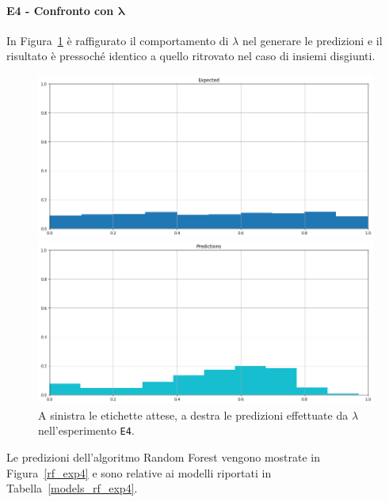 \documentclass[12pt]{report}
\theoremstyle{definition}
\begin{document}
\paragraph{E4 - Confronto con $\bm{\lambda}$}
In Figura~\ref{prediction_exp4} è raffigurato il comportamento di $\lambda$ nel generare le predizioni e il risultato è pressoché identico a quello ritrovato nel caso di insiemi disgiunti.
\begin{figure}
\centering
    \begin{minipage}{0.48\textwidth}
        \includegraphics[width=\linewidth]{images/experiment_uniform_sovrapposti/expected_memberships.png}
    \end{minipage}
    \begin{minipage}{0.48\textwidth}
        \includegraphics[width=\linewidth]{images/experiment_uniform_sovrapposti/prediction_memberships.png}
    \end{minipage}
    \caption{A sinistra le etichette attese, a destra le predizioni effettuate da $\lambda$ nell'esperimento \texttt{E4}.}
    \label{prediction_exp4}
\end{figure} 
Le predizioni dell'algoritmo Random Forest vengono mostrate in Figura~\ref{rf_exp4} e sono relative ai modelli riportati in Tabella~\ref{models_rf_exp4}.
\end{document}

